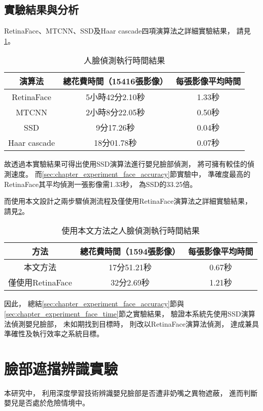 \documentclass[class=NCU_thesis, crop=false]{standalone}
\begin{document}
\subsection{實驗結果與分析}
RetinaFace、MTCNN、SSD及Haar cascade四項演算法之詳細實驗結果，
請見\cref{table:table-face-detection-time}。
\begin{table}[h]
    \centering
    \caption{人臉偵測執行時間結果}
    \label{table:table-face-detection-time}
    \begin{tabular}{ccc}
    \hline
    演算法 & 總花費時間（15416張影像） & 每張影像平均時間 \\
    \hline
    RetinaFace & 5小時42分2.10秒 & 1.33秒 \\
    MTCNN & 2小時8分22.05秒 & 0.50秒 \\
    SSD & 9分17.26秒 & 0.04秒 \\
    Haar cascade & 18分01.78秒 & 0.07秒 \\
    \hline
    \end{tabular}
\end{table}

故透過本實驗結果可得出使用SSD演算法進行嬰兒臉部偵測，
將可擁有較佳的偵測速度。
而\ref{sec:chapter_experiment_face_accuracy}節實驗中，
準確度最高的RetinaFace其平均偵測一張影像需1.33秒，
為SSD的33.25倍。

而使用本文設計之兩步驟偵測流程及僅使用RetinaFace演算法之詳細實驗結果，
請見\cref{table:table-face-detection-time-2}。
\begin{table}[h]
    \centering
    \caption{使用本文方法之人臉偵測執行時間結果}
    \label{table:table-face-detection-time-2}
    \begin{tabular}{ccc}
    \hline
    方法 & 總花費時間（1594張影像） & 每張影像平均時間 \\
    \hline
    本文方法 & 17分51.21秒 & 0.67秒 \\
    僅使用RetinaFace & 32分2.69秒 & 1.21秒 \\
    \hline
    \end{tabular}
\end{table}

因此，
總結\ref{sec:chapter_experiment_face_accuracy}節與\ref{sec:chapter_experiment_face_time}節之實驗結果，
驗證本系統先使用SSD演算法偵測嬰兒臉部，
未如期找到目標時，
則改以RetinaFace演算法偵測，
達成兼具準確性及執行效率之系統目標。

\section{臉部遮擋辨識實驗}
本研究中，
利用深度學習技術辨識嬰兒臉部是否遭非奶嘴之異物遮蔽，
進而判斷嬰兒是否處於危險情境中。
\end{document}
